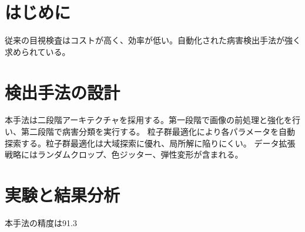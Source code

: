 \documentclass{article}
\begin{document}
\section{はじめに}
従来の目視検査はコストが高く、効率が低い。自動化された病害検出手法が強く求められている。
\section{検出手法の設計}
本手法は二段階アーキテクチャを採用する。第一段階で画像の前処理と強化を行い、第二段階で病害分類を実行する。
粒子群最適化により各パラメータを自動探索する。粒子群最適化は大域探索に優れ、局所解に陥りにくい。
データ拡張戦略にはランダムクロップ、色ジッター、弾性変形が含まれる。
\section{実験と結果分析}
本手法の精度は91.3%
\end{document}
